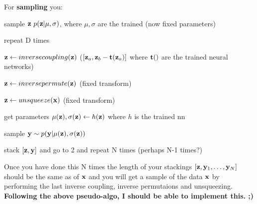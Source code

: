 \begin{notebox}
For \textbf{sampling} you:
\begin{compactenum}
\item sample $\mathbf{z} ~ p(\mathbf{z} | \mu, \sigma)$, where $\mu, \sigma$ are the trained (now fixed parameters)
\item repeat D times
\begin{compactitem}
\item $\mathbf{z} \gets inversecoupling(\mathbf{z})$ ($[\mathbf{z}_a, \mathbf{z}_b - \mathbf{t}(\mathbf{z}_a)]$ where $\mathbf{t}()$ are the trained neural networks)
\item $\mathbf{z} \gets inversepermute(\mathbf{z})$ (fixed transform)
\end{compactitem}
\item $\mathbf{z} \gets unsqueeze(\mathbf{x})$ (fixed transform)
\item get parameters $\mu(\mathbf{z}), \sigma(\mathbf{z}) \gets h(\mathbf{z})$ where $h$ is the trained nn
\item sample $\mathbf{y} \sim p(\mathbf{y} | \mu(\mathbf{z}), \sigma(\mathbf{z}))$
\item stack $[\mathbf{z}, \mathbf{y}]$ and go to 2 and repeat N times (perhaps N-1 times?)
\end{compactenum}
Once you have done this N times the length of your stackings $[\mathbf{z}, \mathbf{y}_1, \ldots, \mathbf{y}_N]$ should be the same as of $\mathbf{x}$ and you will get a sample of the data $\mathbf{x}$ by performing the last inverse coupling, inverse permutaions and unsqueezing. \\

\textbf{Following the above pseudo-algo, I should be able to implement this. ;)}
\end{notebox}


